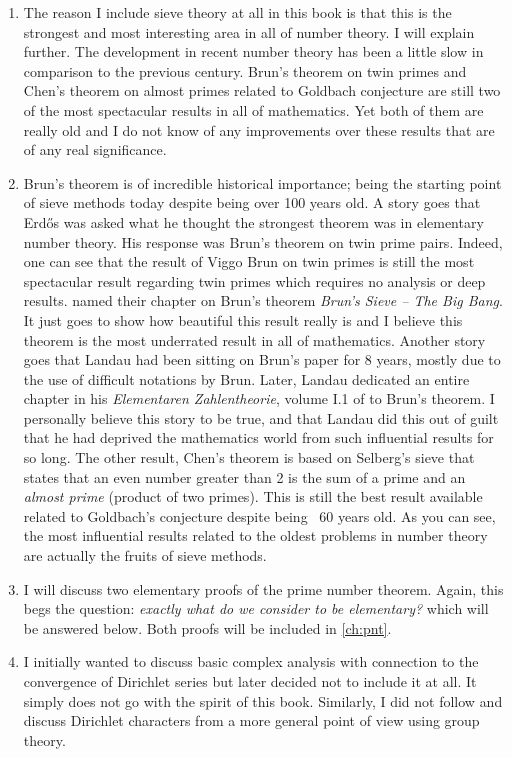 \documentclass[12pt,leqno]{book}
\theoremstyle{definition}
\begin{document}
\begin{enumerate}[(1)]
			\item The reason I include sieve theory at all in this book is that this is the strongest and most interesting area in all of number theory. I will explain further. The development in recent number theory has been a little slow in comparison to the previous century. Brun's theorem on twin primes and Chen's theorem on almost primes related to Goldbach conjecture are still two of the most spectacular results in all of mathematics. Yet both of them are really old and I do not know of any improvements over these results that are of any real significance. \item Brun's theorem is of incredible historical importance; being the starting point of sieve methods today despite being over 100 years old. A story goes that Erd\H{o}s was asked what he thought the strongest theorem was in elementary number theory. His response was Brun's theorem on twin prime pairs. Indeed, one can see that the result of Viggo Brun on twin primes is still the most spectacular result regarding twin primes which requires no analysis or deep results. \textcite[Chapter VI]{friedlander_iwaniec_2010} named their chapter on Brun's theorem \textit{Brun’s Sieve – The Big Bang}. It just goes to show how beautiful this result really is and I believe this theorem is the most underrated result in all of mathematics. Another story goes that Landau had been sitting on Brun's paper for 8 years, mostly due to the use of difficult notations by Brun. Later, Landau dedicated an entire chapter in his \textit{Elementaren Zahlentheorie}, volume I.1 of \textcite{landau_1927} to Brun's theorem. I personally believe this story to be true, and that Landau did this out of guilt that he had deprived the mathematics world from such influential results for so long. The other result, Chen's theorem is based on Selberg's sieve that states that an even number greater than 2 is the sum of a prime and an \textit{almost prime} (product of two primes). This is still the best result available related to Goldbach's conjecture despite being ~60 years old. As you can see, the most influential results related to the oldest problems in number theory are actually the fruits of sieve methods.
			\item I will discuss two elementary proofs of the prime number theorem. Again, this begs the question: \textit{exactly what do we consider to be elementary?} which will be answered below. Both proofs will be included in \autoref{ch:pnt}.
			\item I initially wanted to discuss basic complex analysis with connection to the convergence of Dirichlet series but later decided not to include it at all. It simply does not go with the spirit of this book. Similarly, I did not follow \textcite{apostol_1976} and discuss Dirichlet characters from a more general point of view using group theory.

\end{enumerate}
\end{document}
